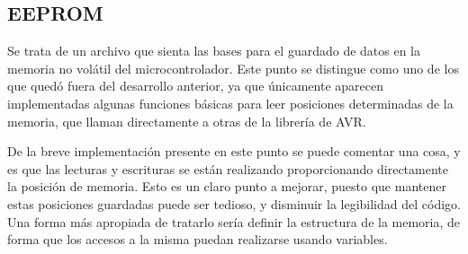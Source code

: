 



\subsection{EEPROM}

Se trata de un archivo que sienta las bases para el guardado de datos en la memoria no volátil del microcontrolador. Este punto se distingue como uno de los que quedó fuera del desarrollo anterior, ya que únicamente aparecen implementadas algunas funciones básicas para leer posiciones determinadas de la memoria, que llaman directamente a otras de la librería de AVR.

De la breve implementación presente en este punto se puede comentar una cosa, y es que las lecturas y escrituras se están realizando proporcionando directamente la posición de memoria. Esto es un claro punto a mejorar, puesto que mantener estas posiciones guardadas puede ser tedioso, y disminuir la legibilidad del código. Una forma más apropiada de tratarlo sería definir la estructura de la memoria, de forma que los accesos a la misma puedan realizarse usando variables.


